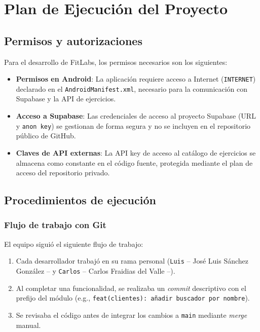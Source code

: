 \chapter{Plan de Ejecución del Proyecto}

\section{Permisos y autorizaciones}

Para el desarrollo de FitLabs, los permisos necesarios son los siguientes:

\begin{itemize}
  \item \textbf{Permisos en Android}: La aplicación requiere acceso a Internet (\texttt{INTERNET}) declarado en el \texttt{AndroidManifest.xml}, necesario para la comunicación con Supabase y la API de ejercicios.
  \item \textbf{Acceso a Supabase}: Las credenciales de acceso al proyecto Supabase (URL y \texttt{anon key}) se gestionan de forma segura y no se incluyen en el repositorio público de GitHub.
  \item \textbf{Claves de API externas}: La API key de acceso al catálogo de ejercicios se almacena como constante en el código fuente, protegida mediante el plan de acceso del repositorio privado.
\end{itemize}

\section{Procedimientos de ejecución}

\subsection{Flujo de trabajo con Git}

El equipo siguió el siguiente flujo de trabajo:

\begin{enumerate}
  \item Cada desarrollador trabajó en su rama personal (\texttt{Luis} -- José Luis Sánchez González -- y \texttt{Carlos} -- Carlos Fraidias del Valle --).
  \item Al completar una funcionalidad, se realizaba un \textit{commit} descriptivo con el prefijo del módulo (e.g., \texttt{feat(clientes): añadir buscador por nombre}).
  \item Se revisaba el código antes de integrar los cambios a \texttt{main} mediante \textit{merge} manual.
\end{enumerate}

